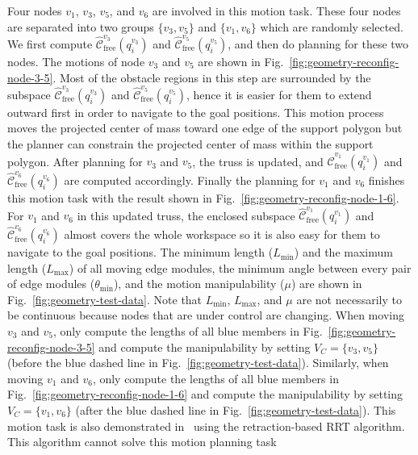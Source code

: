 \documentclass[journal]{IEEEtran}
\begin{document}
Four nodes $v_1$, $v_3$, $v_5$, and $v_6$ are involved in this motion
task. These four nodes are separated into two groups $\{v_3, v_5\}$
and $\{v_1, v_6\}$ which are randomly selected. We first compute
$\widehat{\mathcal{C}}_{\mathrm{free}}^{v_3}(q_i^{v_3})$ and
$\widehat{\mathcal{C}}_{\mathrm{free}}^{v_5}(q_i^{v_5})$, and then do
planning for these two nodes. The motions of node $v_3$ and $v_5$ are
shown in Fig.~\ref{fig:geometry-reconfig-node-3-5}. Most of the
obstacle regions in this step are surrounded by the subspace
$\widehat{\mathcal{C}}_{\mathrm{free}}^{v_3}(q_i^{v_3})$ and
$\widehat{\mathcal{C}}_{\mathrm{free}}^{v_5}(q_i^{v_5})$, hence it is
easier for them to extend outward first in order to navigate to the
goal positions. This motion process moves the projected center of mass
toward one edge of the support polygon but the planner can constrain
the projected center of mass within the support polygon. After
planning for $v_3$ and $v_5$, the truss is updated, and
$\widehat{\mathcal{C}}_{\mathrm{free}}^{v_1}(q_i^{v_1})$ and
$\widehat{\mathcal{C}}_{\mathrm{free}}^{v_6}(q_i^{v_6})$ are computed
accordingly. Finally the planning for $v_1$ and $v_6$ finishes this
motion task with the result shown in
Fig.~\ref{fig:geometry-reconfig-node-1-6}. For $v_1$ and $v_6$ in this
updated truss, the enclosed subspace
$\widehat{\mathcal{C}}_{\mathrm{free}}^{v_1}(q_i^{v_1})$ and
$\widehat{\mathcal{C}}_{\mathrm{free}}^{v_6}(q_i^{v_6})$ almost covers
the whole workspace so it is also easy for them to navigate to the
goal positions. The minimum length ($L_{\min}$) and the maximum length
($L_{\max}$) of all moving edge modules, the minimum angle between
every pair of edge modules ($\theta_{\min}$), and the motion
manipulability ($\mu$) are shown in
Fig.~\ref{fig:geometry-test-data}. Note that $L_{\min}$, $L_{\max}$,
and $\mu$ are not necessarily to be continuous because nodes that are
under control are changing. When moving $v_3$ and $v_5$, only compute
the lengths of all blue members in
Fig.~\ref{fig:geometry-reconfig-node-3-5} and compute the
manipulability by setting $V_C=\{v_3, v_5\}$ (before the blue dashed
line in Fig.~\ref{fig:geometry-test-data}). Similarly, when moving
$v_1$ and $v_6$, only compute the lengths of all blue members in
Fig.~\ref{fig:geometry-reconfig-node-1-6} and compute the
manipulability by setting $V_C=\{v_1, v_6\}$ (after the blue dashed
line in Fig.~\ref{fig:geometry-test-data}). This motion task is also
demonstrated in~\cite{vtt-review-ur-2018} using the retraction-based
RRT algorithm. This algorithm cannot solve this motion planning task
\end{document}
